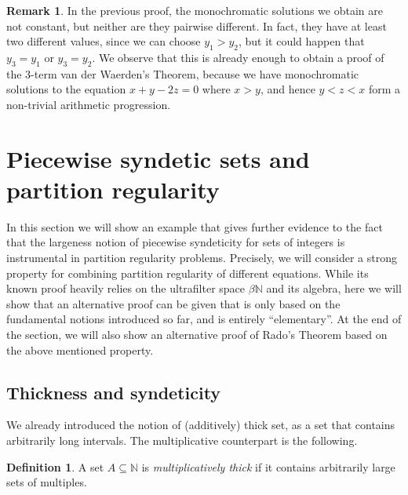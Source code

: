 \documentclass[a4paper,oneside]{article}
\newcommand{\N}{\mathbb{N}}
\theoremstyle{definition}
\newtheorem{remark}[theorem]{Remark}
\newtheorem{definition}[theorem]{Definition}
\theoremstyle{named}
\begin{document}
\begin{remark}
{\rm
In the previous proof, the monochromatic solutions we obtain are not constant, 
but neither are they pairwise different.
In fact, they have at least two different values, 
since we can choose $y_1>y_2$, but it could happen that $y_3=y_1$ or $y_3=y_2$.
We observe that this is already enough to obtain a proof of the
3-term van der Waerden's Theorem, because 
we have monochromatic solutions to the equation $x+y-2z=0$ where $x>y$,
and hence $y<z<x$ form a non-trivial arithmetic progression.}
\end{remark}





\section{Piecewise syndetic sets and partition regularity}

In this section we will show an example that gives further evidence
to the fact that the largeness notion of piecewise syndeticity 
for sets of integers is instrumental in partition regularity problems.
Precisely, we will consider a strong property for combining partition
regularity of different equations. 
While its known proof \cite{lb}
heavily relies on the ultrafilter space $\beta\N$ and its algebra,
here we will show that an alternative proof can be given
that is only based on the fundamental notions  
introduced so far, and is entirely ``elementary''.
At the end of the section,
we will also show an alternative proof of Rado's Theorem
based on the above mentioned property.

\subsection{Thickness and syndeticity}
We already introduced the notion of (additively) thick set,
as a set that contains arbitrarily long intervals.
The multiplicative counterpart is the following.

\begin{definition}
A set $A\subseteq\N$ is \emph{multiplicatively thick} if it contains arbitrarily large
sets of multiples.
\end{definition}

\end{document}
